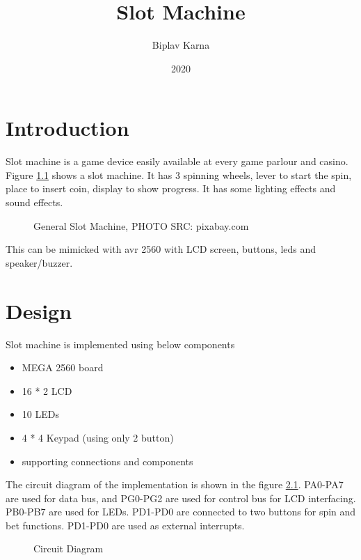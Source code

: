 \documentclass[a4paper,13pt,sffamily,margin=20mm]{memoir}
\title{Slot Machine}
\author{Biplav Karna}
\date{2020}
\begin{document}
\frontmatter

\maketitle


\chapter {Introduction}
Slot machine is a game device easily available at every game parlour and casino. Figure \ref{Fig_Casino_Slot_Machine} shows a slot machine. It has 3 spinning wheels, lever to start the spin, place to insert coin, display to show progress. It has some lighting effects and sound effects. 

\begin{figure}[htbp]
\caption{General Slot Machine, PHOTO SRC: pixabay.com}
\label{Fig_Casino_Slot_Machine}
\end{figure}


This can be mimicked with avr 2560 with LCD screen, buttons, leds and speaker/buzzer.


\chapter {Design}
Slot machine is implemented using below components

\begin{itemize}
\item MEGA 2560 board
\item 16 * 2 LCD 
\item 10 LEDs
\item 4 * 4 Keypad (using only 2 button)
\item supporting connections and components 
\end{itemize}

The circuit diagram of the implementation is shown in the figure \ref{Fig_Circuit_Diagram}. PA0-PA7 are used for data bus, and PG0-PG2 are used for control bus for LCD interfacing. PB0-PB7 are used for LEDs. PD1-PD0 are connected to two buttons for spin and bet functions. PD1-PD0 are used as external interrupts. 

\begin{figure}[h]
\caption{Circuit Diagram }
\label{Fig_Circuit_Diagram}
\end{figure}
\end{document}
